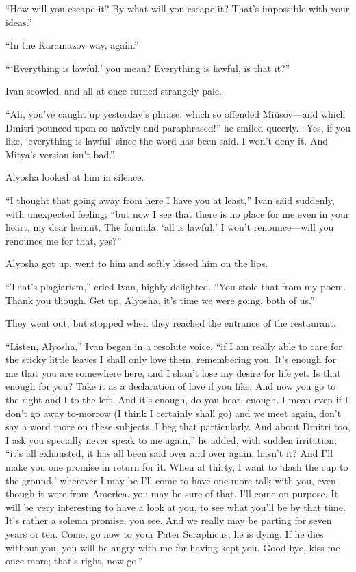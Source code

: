 ``How will you escape it? By what will you escape it? That's
impossible with your ideas.''

``In the Karamazov way, again.''

```Everything is lawful,' you mean? Everything is lawful, is that
it?''

Ivan scowled, and all at once turned strangely pale.

``Ah, you've caught up yesterday's phrase, which so offended
Mi\"{u}sov---and which Dmitri pounced upon so na\"{i}vely and
paraphrased!'' he smiled queerly. ``Yes, if you like, `everything is
lawful' since the word has been said. I won't deny it. And Mitya's
version isn't bad.''

Alyosha looked at him in silence.

``I thought that going away from here I have you at least,'' Ivan said
suddenly, with unexpected feeling; ``but now I see that there is no
place for me even in your heart, my dear hermit. The formula, `all is
lawful,' I won't re\-nounce---will you renounce me for that, yes?''

Alyosha got up, went to him and softly kissed him on the lips.

``That's plagiarism,'' cried Ivan, highly delighted. ``You stole that
from my poem. Thank you though. Get up, Alyosha, it's time we were
going, both of us.''

They went out, but stopped when they reached the entrance of the
restaurant.

``Listen, Alyosha,'' Ivan began in a resolute voice, ``if I am really
able to care for the sticky little leaves I shall only love them,
remembering you. It's enough for me that you are somewhere here, and I
shan't lose my desire for life yet. Is that enough for you? Take it as
a declaration of love if you like. And now you go to the right and I
to the left. And it's enough, do you hear, enough. I mean even if I
don't go away to-morrow (I think I certainly shall go) and we meet
again, don't say a word more on these subjects. I beg that
particularly. And about Dmitri too, I ask you specially never speak to
me again,'' he added, with sudden irritation; ``it's all exhausted, it
has all been said over and over again, hasn't it? And I'll make you
one promise in return for it. When at thirty, I want to `dash the cup
to the ground,' wherever I may be I'll come to have one more talk with
you, even though it were from America,  you may be sure of
that. I'll come on purpose. It will be very interesting to have a look
at you, to see what you'll be by that time. It's rather a solemn
promise, you see. And we really may be parting for seven years or ten.
Come, go now to your Pater Seraphicus, he is dying. If he dies without
you, you will be angry with me for having kept you. Good-bye, kiss me
once more; that's right, now go.''

